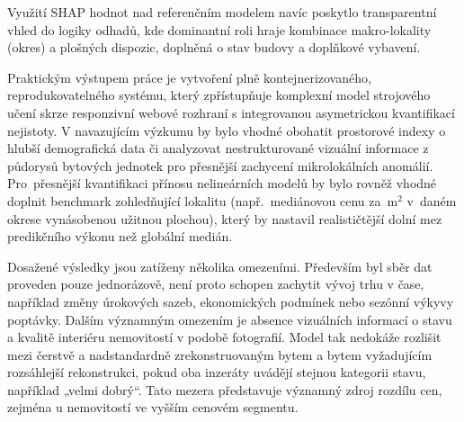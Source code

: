 Využití SHAP hodnot nad referenčním modelem navíc poskytlo transparentní vhled do logiky odhadů, kde dominantní roli hraje kombinace makro-lokality (okres) a plošných dispozic, doplněná o stav budovy a doplňkové vybavení. 

Praktickým výstupem práce je vytvoření plně kontejnerizovaného, reprodukovatelného systému, který zpřístupňuje komplexní model strojového učení skrze responzivní webové rozhraní s integrovanou asymetrickou kvantifikací nejistoty. V navazujícím výzkumu by bylo vhodné obohatit prostorové indexy o hlubší demografická data či analyzovat nestrukturované vizuální informace z půdorysů bytových jednotek pro přesnější zachycení mikrolokálních anomálií. Pro~přesnější kvantifikaci přínosu nelineárních modelů by bylo rovněž vhodné doplnit benchmark zohledňující lokalitu (např.~mediánovou cenu za~$\mathrm{m}^2$ v~daném okrese vynásobenou užitnou plochou), který by nastavil realističtější dolní mez predikčního výkonu než globální medián.

Dosažené výsledky jsou zatíženy několika omezeními. Především byl sběr dat proveden pouze jednorázově, není proto schopen zachytit vývoj trhu v čase, například změny úrokových sazeb, ekonomických podmínek nebo sezónní výkyvy poptávky. Dalším významným omezením je absence vizuálních informací o stavu a kvalitě interiéru nemovitostí v podobě fotografií. Model tak nedokáže rozlišit mezi čerstvě a nadstandardně zrekonstruovaným bytem a bytem vyžadujícím rozsáhlejší rekonstrukci, pokud oba inzeráty uvádějí stejnou kategorii stavu, například „velmi dobrý“. Tato mezera představuje významný zdroj rozdílu cen, zejména u nemovitostí ve vyšším cenovém segmentu.
      